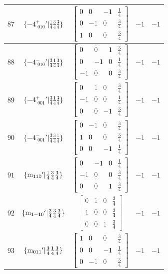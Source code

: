 \documentclass[fleqn,8pt]{jsarticle}
\begin{document}
\begin{longtable}{ccccc}
$ 87 $ & $ \{-4^{+}_{\,\,010}{}'|\frac{1}{4} \frac{3}{4} \frac{3}{4}\} $ & $ \begin{bmatrix} 0 & 0 & -1 & \frac{1}{4} \\ 0 & -1 & 0 & \frac{3}{4} \\ 1 & 0 & 0 & \frac{3}{4} \end{bmatrix} $ & $ -1 $ & $ -1 $ \\ \hline
$ 88 $ & $ \{-4^{-}_{\,\,010}{}'|\frac{3}{4} \frac{1}{4} \frac{3}{4}\} $ & $ \begin{bmatrix} 0 & 0 & 1 & \frac{3}{4} \\ 0 & -1 & 0 & \frac{1}{4} \\ -1 & 0 & 0 & \frac{3}{4} \end{bmatrix} $ & $ -1 $ & $ -1 $ \\ \hline
$ 89 $ & $ \{-4^{+}_{\,\,001}{}'|\frac{3}{4} \frac{1}{4} \frac{3}{4}\} $ & $ \begin{bmatrix} 0 & 1 & 0 & \frac{3}{4} \\ -1 & 0 & 0 & \frac{1}{4} \\ 0 & 0 & -1 & \frac{3}{4} \end{bmatrix} $ & $ -1 $ & $ -1 $ \\ \hline
$ 90 $ & $ \{-4^{-}_{\,\,001}{}'|\frac{3}{4} \frac{3}{4} \frac{1}{4}\} $ & $ \begin{bmatrix} 0 & -1 & 0 & \frac{3}{4} \\ 1 & 0 & 0 & \frac{3}{4} \\ 0 & 0 & -1 & \frac{1}{4} \end{bmatrix} $ & $ -1 $ & $ -1 $ \\ \hline
$ 91 $ & $ \{{\rm m}_{110}{}'|\frac{1}{4} \frac{3}{4} \frac{3}{4}\} $ & $ \begin{bmatrix} 0 & -1 & 0 & \frac{1}{4} \\ -1 & 0 & 0 & \frac{3}{4} \\ 0 & 0 & 1 & \frac{3}{4} \end{bmatrix} $ & $ -1 $ & $ -1 $ \\ \hline
$ 92 $ & $ \{{\rm m}_{1-10}{}'|\frac{3}{4} \frac{3}{4} \frac{3}{4}\} $ & $ \begin{bmatrix} 0 & 1 & 0 & \frac{3}{4} \\ 1 & 0 & 0 & \frac{3}{4} \\ 0 & 0 & 1 & \frac{3}{4} \end{bmatrix} $ & $ -1 $ & $ -1 $ \\ \hline
$ 93 $ & $ \{{\rm m}_{011}{}'|\frac{3}{4} \frac{1}{4} \frac{3}{4}\} $ & $ \begin{bmatrix} 1 & 0 & 0 & \frac{3}{4} \\ 0 & 0 & -1 & \frac{1}{4} \\ 0 & -1 & 0 & \frac{3}{4} \end{bmatrix} $ & $ -1 $ & $ -1 $ \\ \hline

\end{longtable}
\end{document}
